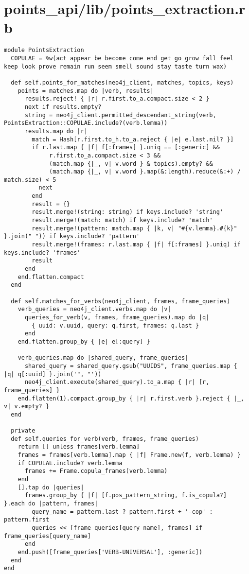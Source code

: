 \documentclass{article}
\begin{document}
\section*{points\_api/lib/points\_extraction.rb}
\begin{verbatim}
module PointsExtraction
  COPULAE = %w(act appear be become come end get go grow fall feel keep look prove remain run seem smell sound stay taste turn wax)

  def self.points_for_matches(neo4j_client, matches, topics, keys)
    points = matches.map do |verb, results|
      results.reject! { |r| r.first.to_a.compact.size < 2 }
      next if results.empty?
      string = neo4j_client.permitted_descendant_string(verb, PointsExtraction::COPULAE.include?(verb.lemma))
      results.map do |r|
        match = Hash[r.first.to_h.to_a.reject { |e| e.last.nil? }]
        if r.last.map { |f| f[:frames] }.uniq == [:generic] &&
             r.first.to_a.compact.size < 3 &&
             (match.map {|_, v| v.word } & topics).empty? &&
             (match.map {|_, v| v.word }.map(&:length).reduce(&:+) / match.size) < 5
          next
        end
        result = {}
        result.merge!(string: string) if keys.include? 'string'
        result.merge!(match: match) if keys.include? 'match'
        result.merge!(pattern: match.map { |k, v| "#{v.lemma}.#{k}" }.join(" ")) if keys.include? 'pattern'
        result.merge!(frames: r.last.map { |f| f[:frames] }.uniq) if keys.include? 'frames'
        result
      end
    end.flatten.compact
  end

  def self.matches_for_verbs(neo4j_client, frames, frame_queries)
    verb_queries = neo4j_client.verbs.map do |v|
      queries_for_verb(v, frames, frame_queries).map do |q|
        { uuid: v.uuid, query: q.first, frames: q.last }
      end
    end.flatten.group_by { |e| e[:query] }

    verb_queries.map do |shared_query, frame_queries|
      shared_query = shared_query.gsub("UUIDS", frame_queries.map { |q| q[:uuid] }.join('", "'))
      neo4j_client.execute(shared_query).to_a.map { |r| [r, frame_queries] }
    end.flatten(1).compact.group_by { |r| r.first.verb }.reject { |_, v| v.empty? }
  end

  private
  def self.queries_for_verb(verb, frames, frame_queries)
    return [] unless frames[verb.lemma]
    frames = frames[verb.lemma].map { |f| Frame.new(f, verb.lemma) }
    if COPULAE.include? verb.lemma
      frames += Frame.copula_frames(verb.lemma)
    end
    [].tap do |queries|
      frames.group_by { |f| [f.pos_pattern_string, f.is_copula?] }.each do |pattern, frames|
        query_name = pattern.last ? pattern.first + '-cop' : pattern.first
        queries << [frame_queries[query_name], frames] if frame_queries[query_name]
      end
    end.push([frame_queries['VERB-UNIVERSAL'], :generic])
  end
end


\end{verbatim}
\pagebreak
\end{document}
